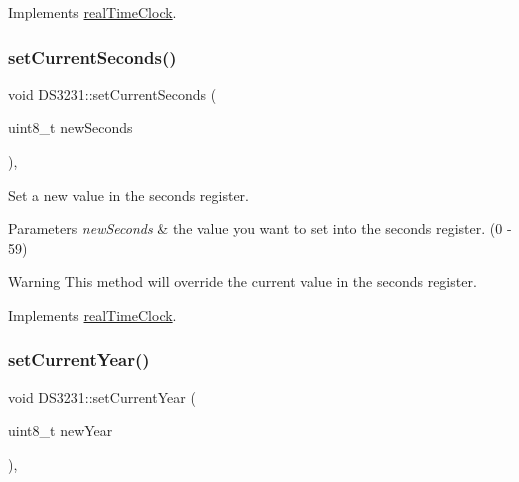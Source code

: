 Implements \mbox{\hyperlink{classreal_time_clock_a2edeb084630a78309bc574eceaf5d6ae}{real\+Time\+Clock}}.

\mbox{\label{class_d_s3231_ac73512cc6c2a37ffb21bee74ea835a09}} 
\subsubsection{\texorpdfstring{set\+Current\+Seconds()}{setCurrentSeconds()}}
{\footnotesize\ttfamily void D\+S3231\+::set\+Current\+Seconds (\begin{DoxyParamCaption}\item[{uint8\+\_\+t}]{new\+Seconds }\end{DoxyParamCaption})\hspace{0.3cm}{\ttfamily [override]}, {\ttfamily [virtual]}}



Set a new value in the seconds register. 


\begin{DoxyParams}{Parameters}
{\em new\+Seconds} & the value you want to set into the seconds register. (0 -\/ 59) \\
\hline
\end{DoxyParams}
\begin{DoxyWarning}{Warning}
This method will override the current value in the seconds register. 
\end{DoxyWarning}


Implements \mbox{\hyperlink{classreal_time_clock_a463a64d4861c75e26a80712e1dd50e6b}{real\+Time\+Clock}}.

\mbox{\label{class_d_s3231_a59a60a725581bc8e5dcf857ea52c6281}} 
\subsubsection{\texorpdfstring{set\+Current\+Year()}{setCurrentYear()}}
{\footnotesize\ttfamily void D\+S3231\+::set\+Current\+Year (\begin{DoxyParamCaption}\item[{uint8\+\_\+t}]{new\+Year }\end{DoxyParamCaption})\hspace{0.3cm}{\ttfamily [override]}, {\ttfamily [virtual]}}



